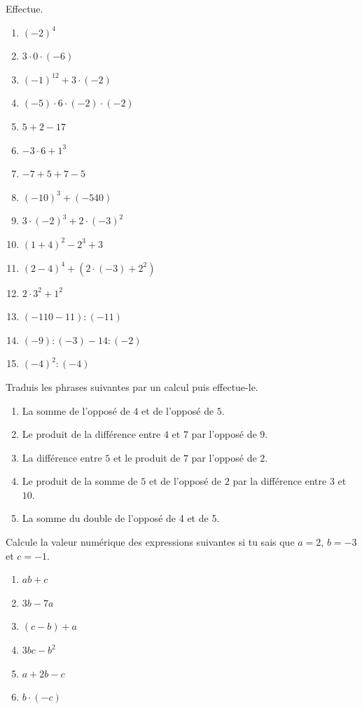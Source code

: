 \documentclass[../../syllabus_1.tex]{subfiles}
\begin{document}
\begin{exercise}
    Effectue.
    \begin{enumerate}[cols=3, itemsep=.4cm]
        \item \(( - 2)^{4}\)
        \item \(3 \cdot 0 \cdot ( - 6)\)
        \item \(( - 1)^{12} + 3 \cdot ( - 2)\)
        \item \(( - 5) \cdot 6 \cdot ( - 2) \cdot ( - 2)\)
        \item \(5 + 2 - 17\)
        \item \(- 3 \cdot 6 + 1^{3}\)
        \item \(- 7 + 5 + 7 - 5\)
        \item \(( - 10)^{3} + ( - 540)\)
        \item \(3 \cdot ( - 2)^{3} + 2 \cdot ( - 3)^{2}\)
        \item \((1 + 4)^{2} - 2^{3} + 3\)
        \item \((2 - 4)^{4} + \left( 2 \cdot ( - 3) + 2^2 \right)\)
        \item \(2 \cdot 3^{2} + 1^{2}\)
        \item \((-110 - 11) : (-11) \)
        \item \((-9) : (-3) - 14 : (-2) \)
        \item \((-4)^2 : (-4) \)
    \end{enumerate}
\end{exercise}

\begin{exercise}
    Traduis les phrases suivantes par un calcul puis effectue-le.
    \begin{enumerate}[itemsep=.3cm]
        \item La somme de l'opposé de \(4\) et de l'opposé de \(5\).
        \item Le produit de la différence entre \(4\) et \(7\) par l'opposé de \(9\).
        \item La différence entre \(5\) et le produit de \(7\) par l'opposé de \(2\).
        \item Le produit de la somme de \(5\) et de l'opposé de \(2\) par la différence entre \(3\) et \(10.\)
        \item La somme du double de l'opposé de 4 et de 5.
    \end{enumerate}

\end{exercise}
\begin{exercise}
    Calcule la valeur numérique des expressions suivantes si tu sais que
    \(a = 2\), \(b = - 3\) et \(c = - 1\).
    \begin{enumerate}[cols=3, itemsep=.4cm]
        \item \(ab + c\)
        \item \(3b - 7a\)
        \item \((c - b) + a\)
        \item \(3bc - b^{2}\)
        \item \(a + 2b - c\)
        \item \(b \cdot ( - c)\)
    \end{enumerate}
\end{exercise}
\end{document}
